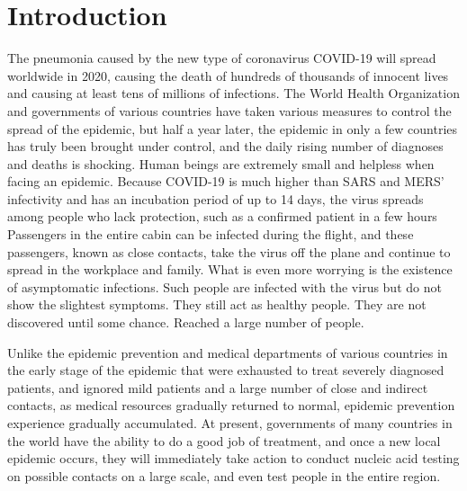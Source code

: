 \documentclass[conference]{IEEEtran}
\begin{document}
\section{Introduction}
The pneumonia caused by the new type of coronavirus COVID-19 will spread worldwide in 2020, causing the death of hundreds of thousands of innocent lives and causing at least tens of millions of infections. The World Health Organization and governments of various countries have taken various measures to control the spread of the epidemic, but half a year later, the epidemic in only a few countries has truly been brought under control, and the daily rising number of diagnoses and deaths is shocking. Human beings are extremely small and helpless when facing an epidemic. Because COVID-19 is much higher than SARS and MERS' infectivity and has an incubation period of up to 14 days, the virus spreads among people who lack protection, such as a confirmed patient in a few hours Passengers in the entire cabin can be infected during the flight, and these passengers, known as close contacts, take the virus off the plane and continue to spread in the workplace and family. What is even more worrying is the existence of asymptomatic infections. Such people are infected with the virus but do not show the slightest symptoms. They still act as healthy people. They are not discovered until some chance. Reached a large number of people.
\par Unlike the epidemic prevention and medical departments of various countries in the early stage of the epidemic that were exhausted to treat severely diagnosed patients, and ignored mild patients and a large number of close and indirect contacts, as medical resources gradually returned to normal, epidemic prevention experience gradually accumulated. At present, governments of many countries in the world have the ability to do a good job of treatment, and once a new local epidemic occurs, they will immediately take action to conduct nucleic acid testing on possible contacts on a large scale, and even test people in the entire region.
\end{document}
